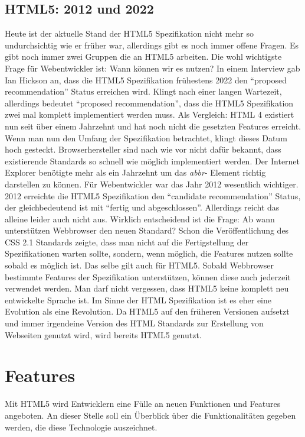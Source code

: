 \subsection{HTML5: 2012 und 2022}
Heute ist der aktuelle Stand der HTML5 Spezifikation nicht mehr so
undurchsichtig wie er früher war, allerdings gibt es noch immer offene Fragen.
\newline\newline
Es gibt noch immer zwei Gruppen die an HTML5 arbeiten. Die wohl wichtigste
Frage für Webentwickler ist: Wann können wir es nutzen? In einem Interview gab
Ian Hickson an, dass die HTML5 Spezifikation frühestens 2022 den ``proposed
recommendation'' Status erreichen wird. Klingt nach einer langen Wartezeit,
allerdings bedeutet ``proposed recommendation'', dass die HTML5 Spezifikation
zwei mal komplett implementiert werden muss. Als Vergleich: HTML 4 existiert
nun seit über einem Jahrzehnt und hat noch nicht die gesetzten Features
erreicht. Wenn man nun den Umfang der Spezifikation betrachtet, klingt dieses
Datum hoch gesteckt. Browserhersteller sind nach wie vor nicht dafür bekannt,
dass existierende Standards so schnell wie möglich implementiert werden. Der
Internet Explorer benötigte mehr als ein Jahrzehnt um das \textit{abbr}-
Element richtig darstellen zu können.
\newline\newline
Für Webentwickler war das Jahr 2012 wesentlich wichtiger. 2012 erreichte die
HTML5 Spezifikation den ``candidate recommendation'' Status, der
gleichbedeutend ist mit "`fertig und abgeschlossen"'. Allerdings reicht das
alleine leider auch nicht aus. Wirklich entscheidend ist die Frage: Ab wann
unterstützen Webbrowser den neuen Standard? Schon die Veröffentlichung des
CSS 2.1 Standards zeigte, dass man nicht auf die Fertigstellung der
Spezifikationen warten sollte, sondern, wenn möglich, die Features nutzen
sollte sobald es möglich ist. Das selbe gilt auch für HTML5. Sobald Webbrowser
bestimmte Features der Spezifikation unterstützen, können diese auch jederzeit
verwendet werden. Man darf nicht vergessen, dass HTML5 keine komplett neu
entwickelte Sprache ist. Im Sinne der HTML Spezifikation ist es eher eine
Evolution als eine Revolution. Da HTML5 auf den früheren Versionen aufsetzt
und immer irgendeine Version des HTML Standards zur Erstellung von Webseiten
genutzt wird, wird bereits HTML5 genutzt.

\section{Features}
Mit HTML5 wird Entwicklern eine Fülle an neuen Funktionen und Features
angeboten. An dieser Stelle soll ein Überblick über die Funktionalitäten
gegeben werden, die diese Technologie auszeichnet.

